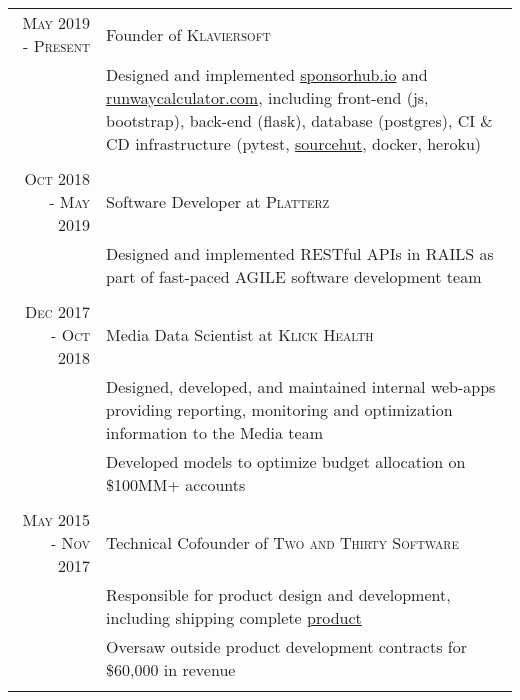 \documentclass[a4paper,11pt]{article} %
\begin{document}
\begin{tabular}{r|p{11cm}}

\textsc{May 2019 - Present} & Founder of \textsc{Klaviersoft} \\
& \footnotesize { Designed and implemented \href{https://www.sponsorhub.io}{sponsorhub.io} and \href{https://www.runwaycalculator.com}{runwaycalculator.com}, including front-end (js, bootstrap), back-end (flask), database (postgres), CI \& CD infrastructure (pytest, \href{https://sourcehut.org}{sourcehut}, docker, heroku) } \\ 
\multicolumn{2}{c}{} \\

\textsc{Oct 2018 - May 2019} & Software Developer at \textsc{Platterz} \\
& \footnotesize { Designed and implemented RESTful APIs in RAILS as part of fast-paced AGILE software development team } \\ 
\multicolumn{2}{c}{} \\

\textsc{Dec 2017 - Oct 2018} & Media Data Scientist at \textsc{Klick Health} \\
& \footnotesize { Designed, developed, and maintained internal web-apps providing reporting, monitoring and optimization information to the Media team } \\
& \footnotesize { Developed models to optimize budget allocation on \$100MM+ accounts } \\
\multicolumn{2}{c}{} \\

\textsc{May 2015 - Nov 2017} & Technical Cofounder of \textsc{Two and Thirty Software} \\
& \footnotesize { Responsible for product design and development, including shipping complete \href{https://store.steampowered.com/app/405240/Hairy\_Little\_Buggers/}{product} } \\
& \footnotesize { Oversaw outside product development contracts for \$60,000 in revenue} \\
\multicolumn{2}{c}{} \\


\end{tabular}
\end{document}
